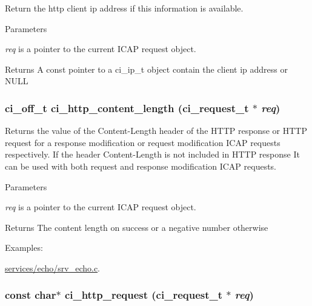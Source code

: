Return the http client ip address if this information is available. 
\begin{DoxyParams}{Parameters}
\item[{\em req}]is a pointer to the current ICAP request object. \end{DoxyParams}
\begin{DoxyReturn}{Returns}
A const pointer to a ci\_\-ip\_\-t object contain the client ip address or NULL 
\end{DoxyReturn}
\hypertarget{group__HTTP_gad381fe7908af08f1543c858d24cfbfdf}{
\subsubsection[{ci\_\-http\_\-content\_\-length}]{\setlength{\rightskip}{0pt plus 5cm}ci\_\-off\_\-t ci\_\-http\_\-content\_\-length ({\bf ci\_\-request\_\-t} $\ast$ {\em req})}}
\label{group__HTTP_gad381fe7908af08f1543c858d24cfbfdf}


Returns the value of the Content-\/Length header of the HTTP response or HTTP request for a response modification or request modification ICAP requests respectively. If the header Content-\/Length is not included in HTTP response It can be used with both request and response modification ICAP requests. 
\begin{DoxyParams}{Parameters}
\item[{\em req}]is a pointer to the current ICAP request object. \end{DoxyParams}
\begin{DoxyReturn}{Returns}
The content length on success or a negative number otherwise 
\end{DoxyReturn}
\begin{Desc}
\item[Examples: ]\par
\hyperlink{services_2echo_2srv__echo_8c-example}{services/echo/srv\_\-echo.c}.\end{Desc}
\hypertarget{group__HTTP_ga44e273b39d82a7c8f13f70586760b130}{
\subsubsection[{ci\_\-http\_\-request}]{\setlength{\rightskip}{0pt plus 5cm}const char$\ast$ ci\_\-http\_\-request ({\bf ci\_\-request\_\-t} $\ast$ {\em req})}}
\label{group__HTTP_ga44e273b39d82a7c8f13f70586760b130}


